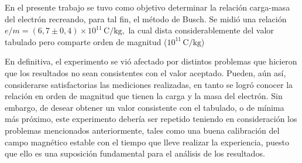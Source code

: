 En el presente trabajo se tuvo como objetivo determinar la relación carga-masa del electrón recreando, para tal fin, el método de Busch.
Se midió una relación $e/m=\left( 6,7 \pm 0,4 \right)\times 10^{11}\,\unit{\coulomb\per\kilogram},$ la cual dista considerablemente del valor tabulado pero comparte orden de magnitud ($10^{11}\,\unit{\coulomb\per\kilogram}$)

En definitiva, el experimento se vió afectado por distintos problemas que hicieron que los resultados no sean consistentes con el valor aceptado. 
Pueden, aún así, considerarse satisfactorias las mediciones realizadas, en tanto se logró conocer la relación en orden de magnitud que tienen la carga y la masa del electrón.
Sin embargo, de desear obtener un valor consistente con el tabulado, o de mínima más próximo, este experimento debería ser repetido teniendo en consideración los problemas mencionados anteriormente,
tales como una buena calibración del campo magnético estable con el tiempo que lleve realizar la experiencia, puesto que ello es una suposición fundamental para el análisis de los resultados.